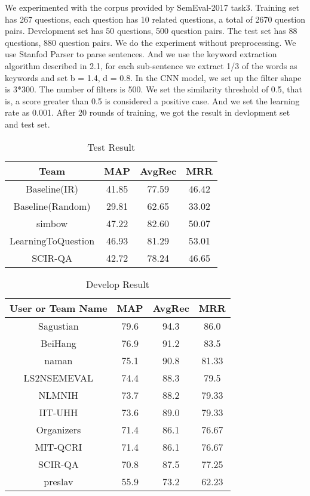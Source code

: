 \documentclass[11pt,a4paper]{article}
\begin{document}
We experimented with the corpus provided by SemEval-2017 task3. Training set has 267 questions, each question has 10 related questions, a total of 2670 question pairs. Development set has 50 questions, 500 question pairs. The test set has 88 questions, 880 question pairs. We do the experiment without preprocessing. We use Stanfod Parser \cite{de2008stanford} to parse sentences. And we use the keyword extraction algorithm described in 2.1, for each sub-sentence we extract 1/3 of the words as keywords and set b = 1.4, d = 0.8. In the CNN model, we set up the filter shape is 3*300. The number of filters is 500. We set the similarity threshold of 0.5, that is, a score greater than 0.5 is considered a positive case. And we set the learning rate as 0.001. After 20 rounds of training, we got the result in devlopment set and test set.
\begin{table}[h]
	\begin{center}
		\begin{tabular}{|c|c|c|c|}
			\hline \bf Team & \bf MAP & \bf AvgRec & \bf MRR \\ 
			\hline Baseline(IR) & 41.85 & 77.59 & 46.42 \\
			\hline Baseline(Random) &29.81  &62.65 & 33.02 \\
			\hline simbow & 47.22 & 82.60 & 50.07 \\
			\hline LearningToQuestion & 46.93 & 81.29 & 53.01 \\
			\hline SCIR-QA &42.72 & 78.24 & 46.65\\
			\hline
		\end{tabular}
	\end{center}
	\caption{\label{Test} Test Result }
\end{table}

\begin{table}[h]
	\begin{center}
		\begin{tabular}{|c|c|c|c|}
			\hline \bf User or Team Name & \bf MAP & \bf AvgRec & \bf MRR \\ 
			\hline Sagustian & 79.6 & 94.3 & 86.0 \\
			\hline BeiHang &76.9  &91.2 &83.5 \\
			\hline naman & 75.1 & 90.8 & 81.33 \\
			\hline LS2NSEMEVAL &74.4 & 88.3 & 79.5 \\
			\hline NLMNIH &73.7 & 88.2 & 79.33\\
			\hline IIT-UHH &73.6 & 89.0 & 79.33\\
			\hline Organizers &71.4 & 86.1 & 76.67\\
			\hline MIT-QCRI &71.4 & 86.1 & 76.67\\
			\hline SCIR-QA &70.8 & 87.5 & 77.25\\
			\hline preslav &55.9 & 73.2 & 62.23\\
			\hline
		\end{tabular}
	\end{center}
	\caption{\label{Develop} Develop Result }
\end{table}
\end{document}
